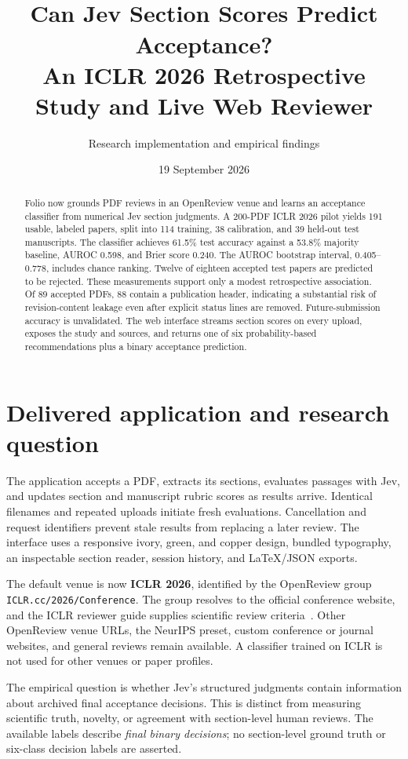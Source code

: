 \documentclass[11pt]{article}
\title{\vspace{-1cm}{\color{copper}\large FOLIO / OPENREVIEW PILOT}\\[0.3cm]
\Huge Can Jev Section Scores Predict Acceptance?\\[0.25cm]
\Large An ICLR 2026 Retrospective Study and Live Web Reviewer}
\author{Research implementation and empirical findings}
\date{19 September 2026}
\begin{document}
\maketitle
\begin{abstract}
Folio now grounds PDF reviews in an OpenReview venue and learns an acceptance classifier from numerical Jev section judgments. A 200-PDF ICLR 2026 pilot yields 191 usable, labeled papers, split into 114 training, 38 calibration, and 39 held-out test manuscripts. The classifier achieves 61.5\% test accuracy against a 53.8\% majority baseline, AUROC 0.598, and Brier score 0.240. The AUROC bootstrap interval, 0.405--0.778, includes chance ranking. Twelve of eighteen accepted test papers are predicted to be rejected. These measurements support only a modest retrospective association. Of 89 accepted PDFs, 88 contain a publication header, indicating a substantial risk of revision-content leakage even after explicit status lines are removed. Future-submission accuracy is unvalidated. The web interface streams section scores on every upload, exposes the study and sources, and returns one of six probability-based recommendations plus a binary acceptance prediction.
\end{abstract}

\section{Delivered application and research question}
The application accepts a PDF, extracts its sections, evaluates passages with Jev, and updates section and manuscript rubric scores as results arrive. Identical filenames and repeated uploads initiate fresh evaluations. Cancellation and request identifiers prevent stale results from replacing a later review. The interface uses a responsive ivory, green, and copper design, bundled typography, an inspectable section reader, session history, and LaTeX/JSON exports.

The default venue is now \textbf{ICLR 2026}, identified by the OpenReview group \texttt{ICLR.cc/2026/Conference}. The group resolves to the official conference website, and the ICLR reviewer guide supplies scientific review criteria~\cite{iclr}. Other OpenReview venue URLs, the NeurIPS preset, custom conference or journal websites, and general reviews remain available. A classifier trained on ICLR is not used for other venues or paper profiles.

The empirical question is whether Jev's structured judgments contain information about archived final acceptance decisions. This is distinct from measuring scientific truth, novelty, or agreement with section-level human reviews. The available labels describe \emph{final binary decisions}; no section-level ground truth or six-class decision labels are asserted.
\end{document}
